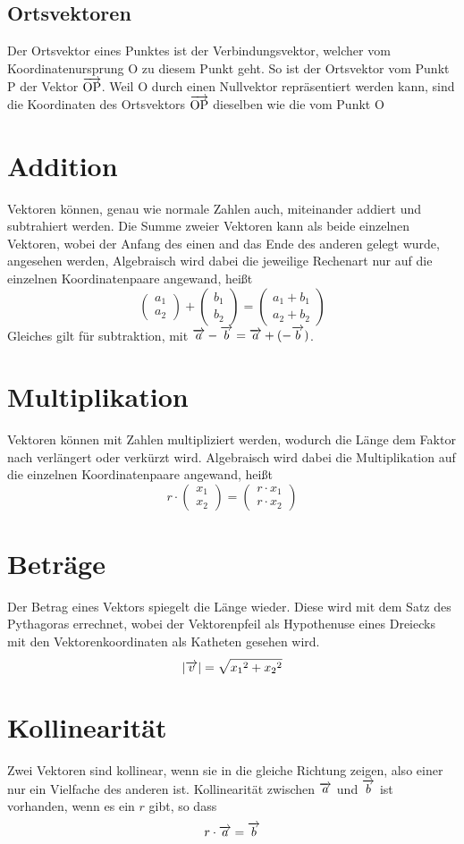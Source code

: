 \documentclass{article}
\begin{document}
\subsection{Ortsvektoren}
Der Ortsvektor eines Punktes ist der Verbindungsvektor, welcher vom Koordinatenursprung $\mathrm{O}$ zu diesem Punkt geht. So ist der Ortsvektor vom Punkt $\mathrm{P}$ der Vektor $\overrightarrow{\mathrm{OP}}$. Weil $\mathrm{O}$ durch einen Nullvektor repräsentiert werden kann, sind die Koordinaten des Ortsvektors $\overrightarrow{\mathrm{OP}}$ dieselben wie die vom Punkt $\mathrm{O}$
 
\section{Addition} 
Vektoren können, genau wie normale Zahlen auch, miteinander addiert und subtrahiert werden. Die Summe zweier Vektoren kann als beide einzelnen Vektoren, wobei der Anfang des einen and das Ende des anderen gelegt wurde, angesehen werden, \newline 
Algebraisch wird dabei die jeweilige Rechenart nur auf die einzelnen Koordinatenpaare angewand, heißt 
\[ 
 \begin{pmatrix} a_1 \\ a_2 \end{pmatrix} +
 \begin{pmatrix} b_1 \\ b_2 \end{pmatrix} =
 \begin{pmatrix} a_1 + b_1 \\ a_2 + b_2 \end{pmatrix} 
\]
Gleiches gilt für subtraktion, mit $\overrightarrow{a} - \overrightarrow{b} = \overrightarrow{a} + (-\overrightarrow{b})$.
 
\section{Multiplikation}
Vektoren können mit Zahlen multipliziert werden, wodurch die Länge dem Faktor nach verlängert oder verkürzt wird. Algebraisch wird dabei die Multiplikation auf die einzelnen Koordinatenpaare angewand, heißt
\[ 
 r \cdot
 \begin{pmatrix} x_1 \\ x_2 \end{pmatrix} =
 \begin{pmatrix} r \cdot x_1 \\ r \cdot x_2 \end{pmatrix} 
\]
 
\section{Beträge} 
Der Betrag eines Vektors spiegelt die Länge wieder. Diese wird mit dem Satz des Pythagoras errechnet, wobei der Vektorenpfeil als Hypothenuse eines Dreiecks mit den Vektorenkoordinaten als Katheten gesehen wird.
\[
 \left| {\overrightarrow{v}} \right| =
 \sqrt{{x_1}^2 + {x_2}^2}
\]
 
\section{Kollinearität} 
Zwei Vektoren sind kollinear, wenn sie in die gleiche Richtung zeigen, also einer nur ein Vielfache des anderen ist. Kollinearität zwischen $\overrightarrow{a}$ und $\overrightarrow{b}$ ist vorhanden, wenn es ein $r$ gibt, so dass 
\[ 
 r \cdot \overrightarrow{a} = \overrightarrow{b}
\]
 
 
\end{document}
